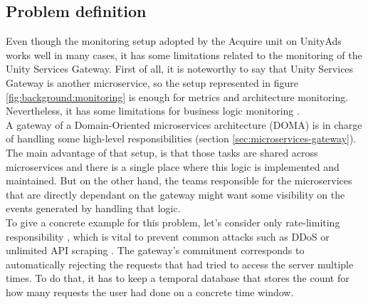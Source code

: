 \documentclass[english, 12pt, a4paper, sci, utf8, a-1b, online]{aaltothesis}
\begin{document}
\subsection{Problem definition}
\label{sec:problem-definition}





Even though the monitoring setup adopted by the Acquire unit on UnityAds works well in many cases, it has some limitations related to the monitoring of the Unity Services Gateway. First of all, it is noteworthy to say that Unity Services Gateway is another microservice, so the setup represented in figure \ref{fig:background:monitoring} is enough for metrics and architecture monitoring. Nevertheless, it has some limitations for business logic monitoring \cite{von2009decision}.\\

A gateway of a Domain-Oriented microservices architecture (DOMA) is in charge of handling some high-level responsibilities (section \ref{sec:microservices-gateway}). The main advantage of that setup, is that those tasks are shared across microservices and there is a single place where this logic is implemented and maintained. But on the other hand, the teams responsible for the microservices that are directly dependant on the gateway might want some visibility on the events generated by handling that logic.\\

To give a concrete example for this problem, let's consider only rate-limiting responsibility \cite{raghavan2007cloud}, which is vital to prevent common attacks \cite{jhaveri2012attacks} such as DDoS \cite{mirkovic2004taxonomy} or unlimited API scraping \cite{WebScrap}. The gateway's commitment corresponds to automatically rejecting the requests that had tried to access the server multiple times. To do that, it has to keep a temporal database that stores the count for how many requests the user had done on a concrete time window.\\
\end{document}
